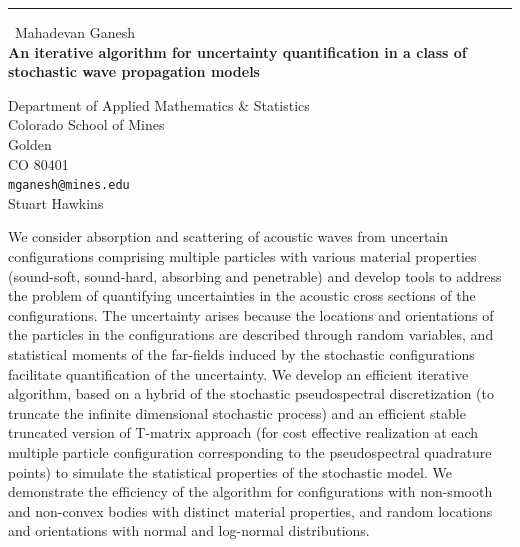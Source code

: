 \documentclass{report}
\begin{document}
\begin{center}
\rule{6in}{1pt} \
{\large Mahadevan Ganesh \\
{\bf An iterative algorithm for uncertainty quantification in a class of stochastic wave propagation models}}

Department of Applied Mathematics & Statistics \\ Colorado School of Mines \\ Golden \\ CO 80401
\\
{\tt mganesh@mines.edu}\\
Stuart Hawkins\end{center}

We consider absorption and scattering of acoustic waves from uncertain
configurations comprising multiple particles with various material
properties (sound-soft, sound-hard, absorbing and penetrable) and develop
tools to address the problem of quantifying uncertainties in the acoustic
cross sections of the configurations. The uncertainty arises because the
locations and orientations of the particles in the configurations are
described through random variables, and statistical moments of the
far-fields induced by the stochastic configurations facilitate
quantification of the uncertainty. We develop an efficient iterative
algorithm, based on a hybrid of the stochastic pseudospectral
discretization (to truncate the infinite dimensional stochastic process)
and an efficient stable truncated version of T-matrix approach (for cost
effective realization at each multiple particle configuration
corresponding to the pseudospectral quadrature points) to simulate the
statistical properties of the stochastic model. We demonstrate the
efficiency of the algorithm for configurations with non-smooth and
non-convex bodies with distinct material properties, and random locations
and orientations with normal and log-normal distributions.
\end{document}
